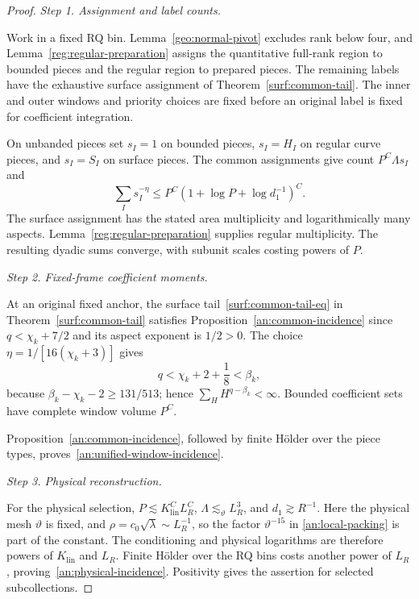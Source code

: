 \documentclass[11pt]{amsart}
\theoremstyle{definition}
\theoremstyle{remark}
\numberwithin{equation}{section}
\begin{document}
\begin{proof}
\par\medskip\noindent\textit{Step 1. Assignment and label counts.}\par\nobreak\smallskip
Work in a fixed RQ bin. Lemma~\ref{geo:normal-pivot} excludes rank below four, and Lemma~\ref{reg:regular-preparation} assigns the quantitative full-rank region to bounded pieces and the regular region to prepared pieces. The remaining labels have the exhaustive surface assignment of Theorem~\ref{surf:common-tail}. The inner and outer windows and priority choices are fixed before an original label is fixed for coefficient integration.

On unbanded pieces set $s_I=1$ on bounded pieces, $s_I=H_I$ on regular curve pieces, and $s_I=S_I$ on surface pieces. The common assignments give count $P^C\Lambda s_I$ and
\[
\sum_I s_I^{-\eta}\le P^C(1+\log P+\log d_1^{-1})^C.
\]
The surface assignment has the stated area multiplicity and logarithmically many aspects. Lemma~\ref{reg:regular-preparation} supplies regular multiplicity. The resulting dyadic sums converge, with subunit scales costing powers of $P$.

\par\medskip\noindent\textit{Step 2. Fixed-frame coefficient moments.}\par\nobreak\smallskip
At an original fixed anchor, the surface tail~\eqref{surf:common-tail-eq} in Theorem~\ref{surf:common-tail} satisfies Proposition~\ref{an:common-incidence} since $q<\chi_k+7/2$ and its aspect exponent is $1/2>0$. The choice $\eta=1/[16(\chi_k+3)]$ gives
\begin{equation}\label{an:q-margin}
q<\chi_k+2+\frac18<\beta_k,
\end{equation}
because $\beta_k-\chi_k-2\ge131/513$; hence $\sum_HH^{q-\beta_k}<\infty$. Bounded coefficient sets have complete window volume $P^C$.


Proposition~\ref{an:common-incidence}, followed by finite H\"older over the piece types, proves~\eqref{an:unified-window-incidence}.

\par\medskip\noindent\textit{Step 3. Physical reconstruction.}\par\nobreak\smallskip
For the physical selection, $P\lesssim K_{\mathrm{lin}}^CL_R^C$, $\Lambda\lesssim_\vartheta L_R^3$, and $d_1\gtrsim R^{-1}$. Here the physical mesh $\vartheta$ is fixed, and $\rho=c_0\sqrt\lambda\sim L_R^{-1}$, so the factor $\vartheta^{-15}$ in \eqref{an:local-packing} is part of the constant. The conditioning and physical logarithms are therefore powers of $K_{\mathrm{lin}}$ and $L_R$. Finite H\"older over the RQ bins costs another power of $L_R$, proving~\eqref{an:physical-incidence}. Positivity gives the assertion for selected subcollections.
\end{proof}
\end{document}
